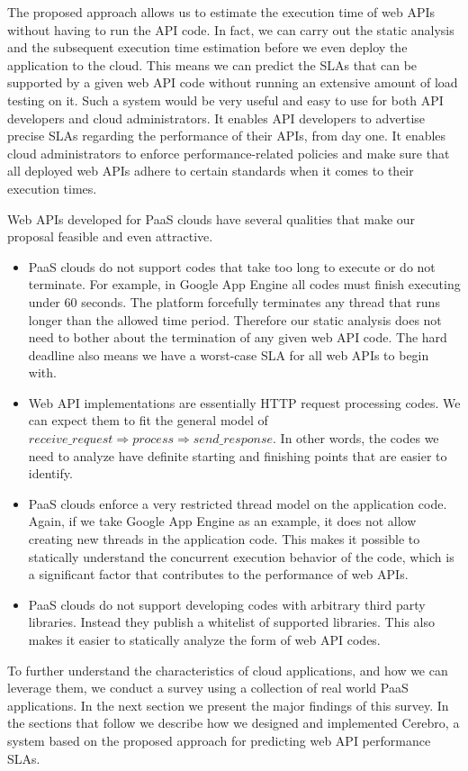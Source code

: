 The proposed approach allows us to estimate the execution time of web APIs without having to
run the API code.
In fact, we can carry out the static analysis and the subsequent execution time
estimation before we even deploy the application to the cloud. 
This means we can predict the SLAs that can be supported by a given web API code
without running an extensive amount of load testing on it. 
Such a system would be very useful and
easy to use for both API developers and cloud administrators. It enables API developers
to advertise precise SLAs regarding the performance of their APIs, from day one. It enables
cloud administrators to enforce performance-related policies and make sure that all deployed 
web APIs adhere to certain standards when it comes to their execution times.

Web APIs developed for PaaS clouds have several qualities that make our proposal
feasible and even attractive.

\begin{itemize}
\item PaaS clouds do not support codes that take too long to execute or do not terminate. For 
example, in Google App Engine all codes must finish executing under 60 seconds.
The platform forcefully terminates any thread that runs longer than the allowed time period.
Therefore our static analysis does not need to bother about the termination of any given web API
code. The hard deadline also means we have a worst-case SLA for all web APIs to begin with.
\item Web API implementations are essentially HTTP request processing codes. We can expect them
to fit the general model of $receive\_request \Rightarrow process \Rightarrow send\_response$. In
other words, the codes we need to analyze have definite starting and finishing points that are easier
to identify.
\item PaaS clouds enforce a very restricted thread model on the application code. Again, if we take
Google App Engine as an example, it does not allow creating new threads in the application code. This
makes it possible to statically understand the concurrent execution behavior of the code, which is a significant
factor that contributes to the performance of web APIs.
\item PaaS clouds do not support developing codes with arbitrary third party libraries. Instead they
publish a whitelist of supported libraries. This also makes it easier to statically analyze the form of web API codes.
\end{itemize}

To further understand the characteristics of cloud applications, and how we can leverage them,
we conduct a survey
using a collection of real world PaaS applications. In the next section we present the major findings
of this survey.
In the sections that follow we describe how we designed and implemented Cerebro, a system based on
the proposed approach for predicting web API performance SLAs.